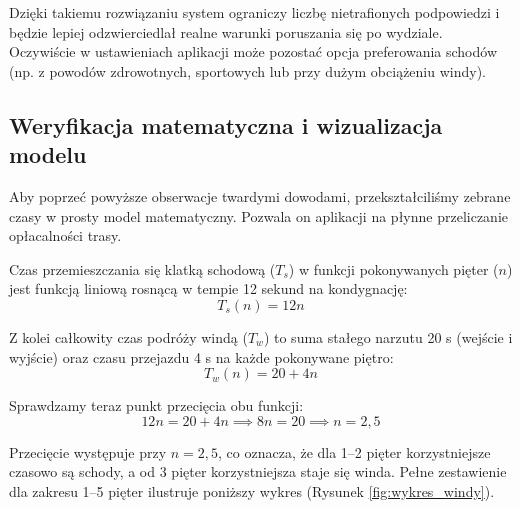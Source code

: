 \documentclass{article}
\begin{document}
Dzięki takiemu rozwiązaniu system ograniczy liczbę nietrafionych podpowiedzi i będzie lepiej odzwierciedlał realne warunki poruszania się po wydziale. Oczywiście w ustawieniach aplikacji może pozostać opcja preferowania schodów (np. z powodów zdrowotnych, sportowych lub przy dużym obciążeniu windy).

\subsection{Weryfikacja matematyczna i wizualizacja modelu}

Aby poprzeć powyższe obserwacje twardymi dowodami, przekształciliśmy zebrane czasy w prosty model matematyczny. Pozwala on aplikacji na płynne przeliczanie opłacalności trasy. 

Czas przemieszczania się klatką schodową ($T_s$) w funkcji pokonywanych pięter ($n$) jest funkcją liniową rosnącą w tempie 12 sekund na kondygnację:
\begin{equation}
    T_s(n) = 12n
\end{equation}

Z kolei całkowity czas podróży windą ($T_w$) to suma stałego narzutu 20 s (wejście i wyjście) oraz czasu przejazdu 4 s na każde pokonywane piętro:
\begin{equation}
    T_w(n) = 20 + 4n
\end{equation}

Sprawdzamy teraz punkt przecięcia obu funkcji:
\begin{equation}
    12n = 20 + 4n \implies 8n = 20 \implies n = 2{,}5
\end{equation}

Przecięcie występuje przy $n=2{,}5$, co oznacza, że dla 1--2 pięter korzystniejsze czasowo są schody, a od 3 pięter korzystniejsza staje się winda. Pełne zestawienie dla zakresu 1--5 pięter ilustruje poniższy wykres (Rysunek \ref{fig:wykres_windy}).
\end{document}

